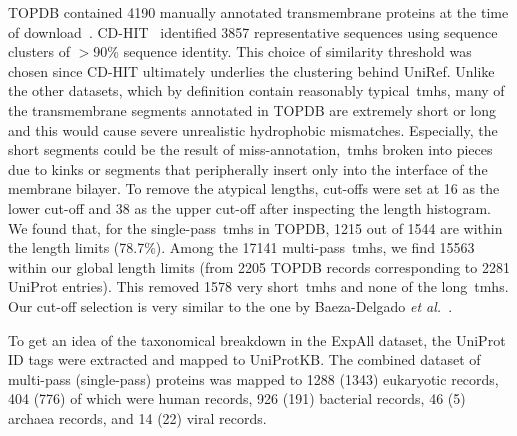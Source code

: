 TOPDB contained 4190 manually annotated transmembrane proteins at the time of download~\cite{Dobson2015}.
CD-HIT~\cite{Huang2010} identified 3857 representative sequences using sequence clusters of $>$90\% sequence identity.
This choice of similarity threshold was chosen since CD-HIT ultimately underlies the clustering behind UniRef.
Unlike the other datasets, which by definition contain reasonably typical~\gls{tmh}s, many of the transmembrane segments annotated in TOPDB are extremely short or long and this would cause severe unrealistic hydrophobic mismatches.
Especially, the short segments could be the result of miss-annotation,~\gls{tmh}s broken into pieces due to kinks or segments that peripherally insert only into the interface of the membrane bilayer.
To remove the atypical lengths, cut-offs were set at 16 as the lower cut-off and 38 as the upper cut-off after inspecting the length histogram.
We found that, for the single-pass~\gls{tmh}s in TOPDB, 1215 out of 1544 are within the length limits (78.7\%).
Among the 17141 multi-pass~\gls{tmh}s, we find 15563 within our global length limits (from 2205 TOPDB records corresponding to 2281 UniProt entries).
This removed 1578 very short~\gls{tmh}s and none of the long~\gls{tmh}s.
Our cut-off selection is very similar to the one by Baeza-Delgado \textit{et al.}~\cite{Baeza-Delgado2013}.

To get an idea of the taxonomical breakdown in the ExpAll dataset, the UniProt ID tags were extracted and mapped to UniProtKB.
The combined dataset of multi-pass (single-pass) proteins was mapped to 1288 (1343) eukaryotic records, 404 (776) of which were human records, 926 (191) bacterial records, 46 (5) archaea records, and 14 (22) viral records.


